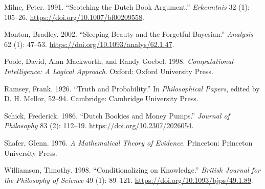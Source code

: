 \documentclass[
  11pt,
  letterpaper,
  DIV=11,
  numbers=noendperiod,
  oneside]{scrartcl}
\newlength{\cslhangindent}
\newenvironment{CSLReferences}[2] %
 {\begin{list}{}{%
  \setlength{\itemindent}{0pt}
  \setlength{\leftmargin}{0pt}
  \setlength{\parsep}{0pt}
  \ifodd #1
   \setlength{\leftmargin}{\cslhangindent}
   \setlength{\itemindent}{-1\cslhangindent}
  \fi
  \setlength{\itemsep}{#2\baselineskip}}}
 {\end{list}}
\begin{document}
\begin{CSLReferences}{1}{0}
Milne, Peter. 1991. {``Scotching the Dutch Book Argument.''}
\emph{Erkenntnis} 32 (1): 105--26.
\url{https://doi.org/10.1007/bf00209558}.

Monton, Bradley. 2002. {``Sleeping Beauty and the Forgetful Bayesian.''}
\emph{Analysis} 62 (1): 47--53.
\url{https://doi.org/10.1093/analys/62.1.47}.

Poole, David, Alan Mackworth, and Randy Goebel. 1998.
\emph{Computational Intelligence: A Logical Approach}. Oxford: Oxford
University Press.

Ramsey, Frank. 1926. {``Truth and Probability.''} In \emph{Philosophical
Papers}, edited by D. H. Mellor, 52--94. Cambridge: Cambridge University
Press.

Schick, Frederick. 1986. {``Dutch Bookies and Money Pumps.''}
\emph{Journal of Philosophy} 83 (2): 112--19.
\url{https://doi.org/10.2307/2026054}.

Shafer, Glenn. 1976. \emph{A Mathematical Theory of Evidence}.
Princeton: Princeton University Press.

Williamson, Timothy. 1998. {``{Conditionalizing on Knowledge}.''}
\emph{British Journal for the Philosophy of Science} 49 (1): 89--121.
\url{https://doi.org/10.1093/bjps/49.1.89}.

\end{CSLReferences}
\end{document}

